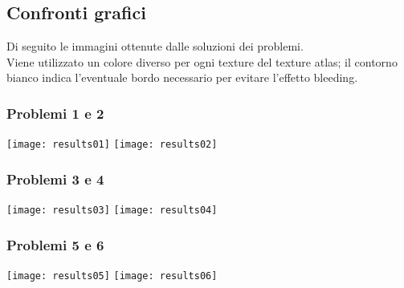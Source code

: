 \newpage

\subsection{Confronti grafici}

Di seguito le immagini ottenute dalle soluzioni dei problemi. \\
Viene utilizzato un colore diverso per ogni texture del texture atlas; il contorno bianco indica l'eventuale bordo necessario per evitare l'effetto bleeding. 


\subsubsection{Problemi 1 e 2}
\begin{minipage}{\textwidth}
\centering
\texttt{[image: results01]}
\hspace{1cm}
\texttt{[image: results02]}
\end{minipage}

\subsubsection{Problemi 3 e 4}
\begin{minipage}{\textwidth}
\centering
\texttt{[image: results03]}
\hspace{1cm}
\texttt{[image: results04]}
\end{minipage}

\subsubsection{Problemi 5 e 6}
\begin{minipage}{\textwidth}
\centering
\texttt{[image: results05]}
\hspace{1cm}
\texttt{[image: results06]}
\end{minipage}






\iffalse

